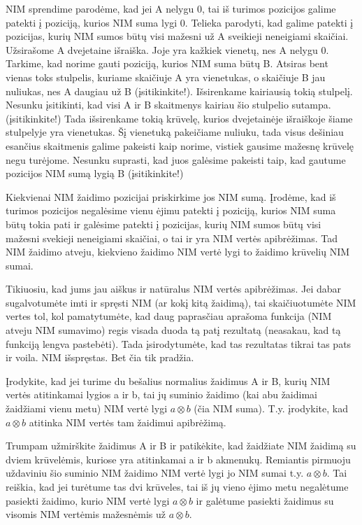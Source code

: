 NIM sprendime parodėme, kad jei A nelygu 0, tai iš turimos pozicijos galime
patekti į poziciją, kurios NIM suma lygi 0. Telieka parodyti, kad galime
patekti į pozicijas, kurių NIM sumos būtų visi mažesni už A sveikieji
neneigiami skaičiai. Užsirašome A dvejetaine išraiška. Joje yra kažkiek
vienetų, nes A nelygu 0. Tarkime, kad norime gauti poziciją, kurios NIM suma
būtų B. Atsiras bent vienas toks stulpelis, kuriame skaičiuje A yra vienetukas,
o skaičiuje B jau nuliukas, nes A daugiau už B (įsitikinkite!). Išsirenkame
kairiausią tokią stulpelį. Nesunku įsitikinti, kad visi A ir B skaitmenys
kairiau šio stulpelio sutampa. (įsitikinkite!) Tada išsirenkame tokią krūvelę,
kurios dvejetainėje išraiškoje šiame stulpelyje yra vienetukas. Šį vienetuką
pakeičiame nuliuku, tada visus dešiniau esančius skaitmenis galime pakeisti
kaip norime, vistiek gausime mažesnę krūvelę negu turėjome. Nesunku suprasti,
kad juos galėsime pakeisti taip, kad gautume pozicijos NIM sumą lygią B
(įsitikinkite!)

Kiekvienai NIM žaidimo pozicijai priskirkime jos NIM sumą. Įrodėme, kad iš
turimos pozicijos negalėsime vienu ėjimu patekti į poziciją, kurios NIM suma
būtų tokia pati ir galėsime patekti į pozicijas, kurių NIM sumos būtų visi
mažesni svekieji neneigiami skaičiai, o tai ir yra NIM vertės apibrėžimas. Tad
NIM žaidimo atveju, kiekvieno žaidimo NIM vertė lygi to žaidimo krūvelių NIM
sumai.

Tikiuosiu, kad jums jau aiškus ir natūralus NIM vertės apibrėžimas. Jei dabar
sugalvotumėte imti ir spręsti NIM (ar kokį kitą žaidimą), tai skaičiuotumėte
NIM vertes tol, kol pamatytumėte, kad daug paprasčiau aprašoma funkcija (NIM
atveju NIM sumavimo) regis visada duoda tą patį rezultatą (neasakau, kad tą
funkciją lengva pastebėti). Tada įsirodytumėte, kad tas rezultatas tikrai tas
pats ir voila. NIM išspręstas. Bet čia tik pradžia.

\begin{pavnr}
  Įrodykite, kad jei turime du bešalius normalius žaidimus A ir B, kurių NIM
  vertės atitinkamai lygios a ir b, tai jų suminio žaidimo (kai abu žaidimai
  žaidžiami vienu metu) NIM vertė lygi  $a\otimes b$ (čia NIM suma). T.y.
  įrodykite, kad  $a\otimes b$ atitinka NIM vertės tam žaidimui apibrėžimą.
\end{pavnr}

Trumpam užmirškite žaidimus A ir B ir patikėkite, kad žaidžiate NIM žaidimą su
dviem krūvelėmis, kuriose yra atitinkamai a ir b akmenukų. Remiantis pirmuoju
uždaviniu šio suminio NIM žaidimo NIM vertė lygi jo NIM sumai t.y.  $a\otimes
b$. Tai reiškia, kad jei turėtume tas dvi krūveles, tai iš jų vieno ėjimo metu
negalėtume pasiekti žaidimo, kurio NIM vertė lygi  $a\otimes b$ ir galėtume
pasiekti žaidimus su visomis NIM vertėmis mažesnėmis už $a\otimes b$. 


